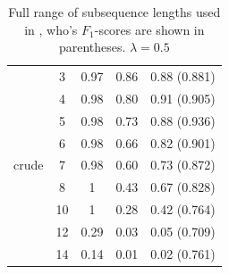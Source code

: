 \begin{table}
\begin{tabular}{| c | c | c | c | c | }
		
		& 3 & 0.97 & 0.86 &  0.88  (0.881)  \\ 
		& 4 & 0.98 & 0.80 & 0.91  (0.905)   \\ 
		& 5 & 0.98 & 0.73 &  0.88 (0.936)   \\ 
		& 6 & 0.98 & 0.66 &  0.82  (0.901)  \\
		crude& 7 & 0.98 & 0.60 &  0.73 (0.872)  \\
		& 8 & 1 & 0.43 &  0.67   (0.828) \\ 
		& 10 & 1 & 0.28 &  0.42   (0.764) \\ 
		& 12 & 0.29 & 0.03 &  0.05   (0.709) \\ 
		& 14 & 0.14 & 0.01 &  0.02   (0.761) \\ \hline 
			
	\end{tabular}
\caption{Full range of subsequence lengths used in \cite{lodhi}, who's  $ F_1 $-scores are shown in parentheses.  $  \lambda = 0.5$\label{tab:appendix_ssk_n}}

\end{table}




\pagebreak